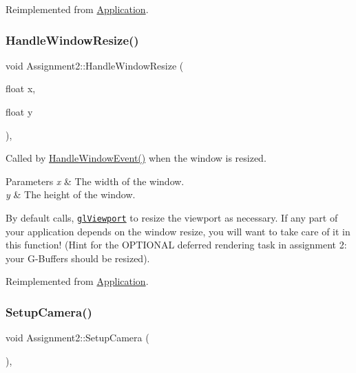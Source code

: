 Reimplemented from \hyperlink{class_application_ae6074c3f102de1cb2fe4c81b545679db}{Application}.

\hypertarget{class_assignment2_a1af734567de5e8e73a2fd726fe3914f2}{}\label{class_assignment2_a1af734567de5e8e73a2fd726fe3914f2} 
\subsubsection{\texorpdfstring{Handle\+Window\+Resize()}{HandleWindowResize()}}
{\footnotesize\ttfamily void Assignment2\+::\+Handle\+Window\+Resize (\begin{DoxyParamCaption}\item[{float}]{x,  }\item[{float}]{y }\end{DoxyParamCaption})\hspace{0.3cm}{\ttfamily [protected]}, {\ttfamily [virtual]}}



Called by \hyperlink{class_application_a74d92db64e051efa56d0357989dcb755}{Handle\+Window\+Event()} when the window is resized. 


\begin{DoxyParams}{Parameters}
{\em x} & The width of the window. \\
\hline
{\em y} & The height of the window.\\
\hline
\end{DoxyParams}
By default calls, \href{https://www.opengl.org/sdk/docs/man/html/glViewport.xhtml}{\tt gl\+Viewport} to resize the viewport as necessary. If any part of your application depends on the window resize, you will want to take care of it in this function! (Hint for the O\+P\+T\+I\+O\+N\+AL deferred rendering task in assignment 2\+: your \textquotesingle{}G-\/\+Buffers\textquotesingle{} should be resized). 

Reimplemented from \hyperlink{class_application_abdba284a0f075ee1d4a2108c3a5236a2}{Application}.

\hypertarget{class_assignment2_ab9ace1ffdac8f7425c64d661f3d13acd}{}\label{class_assignment2_ab9ace1ffdac8f7425c64d661f3d13acd} 
\subsubsection{\texorpdfstring{Setup\+Camera()}{SetupCamera()}}
{\footnotesize\ttfamily void Assignment2\+::\+Setup\+Camera (\begin{DoxyParamCaption}{ }\end{DoxyParamCaption})\hspace{0.3cm}{\ttfamily [private]}, {\ttfamily [virtual]}}



